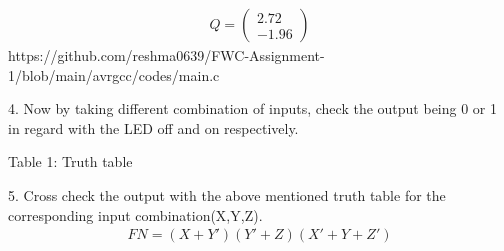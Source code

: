 \documentclass[12pt,a4paper]{report}
\begin{document}
\begin{multicols}{2}
\begin{align}
	Q = \begin{pmatrix} 2.72\\-1.96 \end{pmatrix}
\end{align}
\centering https://github.com/reshma0639/FWC-Assignment-1/blob/main/avrgcc/codes/main.c \vspace{2mm}
\\ \raggedright 4. Now by taking different combination of inputs, check the output being 0 or 1 in regard with the LED off and on respectively. \vspace{2mm}

\centering Table 1: Truth table \vspace{2mm}
\\ \raggedright 5. Cross check the output with the above mentioned truth table for the corresponding input combination(X,Y,Z). \vspace{7mm}\\
\begin{eqnarray*}
FN =(X+Y')(Y'+Z)(X'+Y+Z')
\end{eqnarray*}

\end{multicols}
\end{document}
